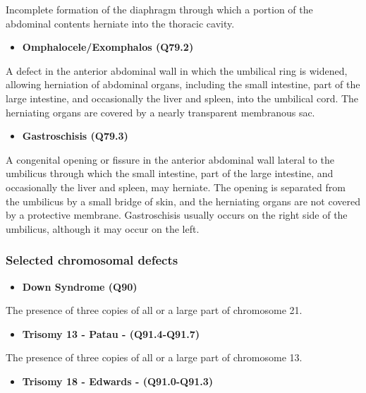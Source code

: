 \documentclass[
]{krantz}
\providecommand{\tightlist}{%
  \setlength{\itemsep}{0pt}\setlength{\parskip}{0pt}}
\begin{document}
Incomplete formation of the diaphragm through which a portion of the
abdominal contents herniate into the thoracic cavity.

\begin{itemize}
\tightlist
\item
  \textbf{Omphalocele/Exomphalos (Q79.2)}
\end{itemize}

A defect in the anterior abdominal wall in which the umbilical ring is widened, allowing herniation of abdominal organs, including the small intestine, part of the large intestine, and occasionally the liver and spleen, into the umbilical cord. The herniating organs are covered by a nearly transparent membranous sac.

\begin{itemize}
\tightlist
\item
  \textbf{Gastroschisis (Q79.3)}
\end{itemize}

A congenital opening or fissure in the anterior abdominal wall lateral to the umbilicus through which the small intestine, part of the large intestine, and occasionally the liver and spleen, may herniate. The opening is separated from the umbilicus by a small bridge of skin, and the herniating organs are not covered by a protective membrane. Gastroschisis usually occurs on the right side of the umbilicus, although it may occur on the left.

\hypertarget{section21112}{%
\subsubsection{Selected chromosomal defects}\label{section21112}}

\begin{itemize}
\tightlist
\item
  \textbf{Down Syndrome (Q90)}
\end{itemize}

The presence of three copies of all or a large part of chromosome 21.

\begin{itemize}
\tightlist
\item
  \textbf{Trisomy 13 - Patau - (Q91.4-Q91.7)}
\end{itemize}

The presence of three copies of all or a large part of chromosome 13.

\begin{itemize}
\tightlist
\item
  \textbf{Trisomy 18 - Edwards - (Q91.0-Q91.3)}
\end{itemize}
\end{document}
